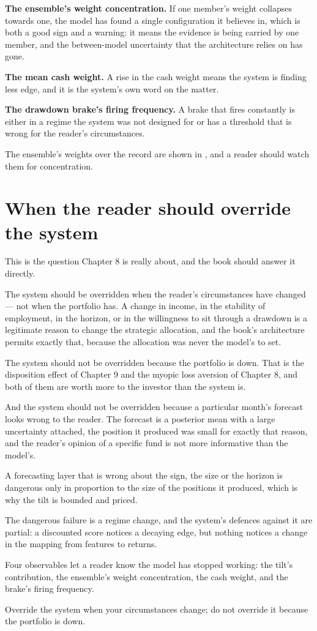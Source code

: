 \textbf{The ensemble's weight concentration.} If one member's weight
collapses towards one, the model has found a single configuration it
believes in, which is both a good sign and a warning: it means the
evidence is being carried by one member, and the between-model uncertainty
that the architecture relies on has gone.

\textbf{The mean cash weight.} A rise in the cash weight means the system
is finding less edge, and it is the system's own word on the matter.

\textbf{The drawdown brake's firing frequency.} A brake that fires
constantly is either in a regime the system was not designed for or has a
threshold that is wrong for the reader's circumstances.

The ensemble's weights over the record are shown in , and a reader should watch them for concentration.

\section{When the reader should override the system}

This is the question Chapter 8 is really about, and the book should
answer it directly.

The system should be overridden when the reader's circumstances have
changed --- not when the portfolio has. A change in income, in the
stability of employment, in the horizon, or in the willingness to sit
through a drawdown is a legitimate reason to change the strategic
allocation, and the book's architecture permits exactly that, because the
allocation was never the model's to set.

The system should not be overridden because the portfolio is down. That is
the disposition effect of Chapter 9 and the myopic loss aversion of
Chapter 8, and both of them are worth more to the investor than the
system is.

And the system should not be overridden because a particular month's
forecast looks wrong to the reader. The forecast is a posterior mean with
a large uncertainty attached, the position it produced was small for
exactly that reason, and the reader's opinion of a specific fund is not
more informative than the model's.

\begin{keytakeaways}
\item A forecasting layer that is wrong about the sign, the size or the
horizon is dangerous only in proportion to the size of the positions it
produced, which is why the tilt is bounded and priced.
\item The dangerous failure is a regime change, and the system's defences
against it are partial: a discounted score notices a decaying edge, but
nothing notices a change in the mapping from features to returns.
\item Four observables let a reader know the model has stopped working: the
tilt's contribution, the ensemble's weight concentration, the cash
weight, and the brake's firing frequency.
\item Override the system when your circumstances change; do not override
it because the portfolio is down.
\end{keytakeaways}
